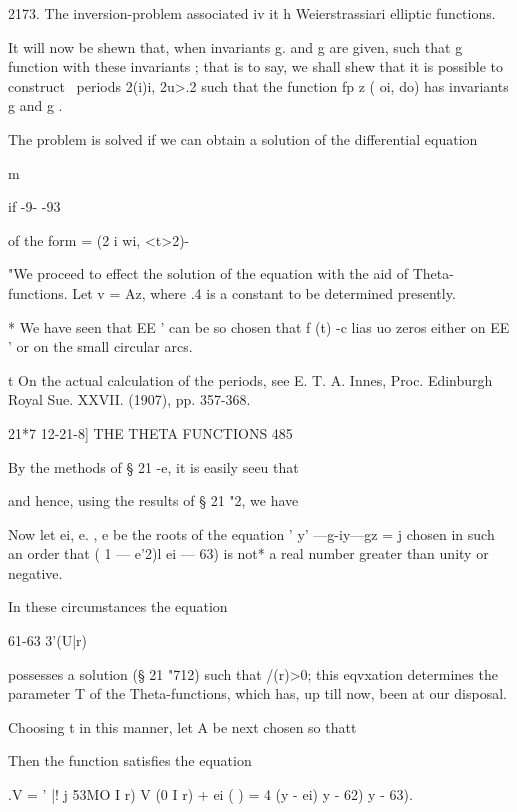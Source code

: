 2173. The inversion-problem associated iv it h Weierstrassiari
elliptic functions.

It will now be shewn that, when invariants g. and g are given, such
that g %
function with these invariants ; that is to say, we shall shew that it
is possible to construct \ periods 2(i)i, 2u>.2 such that the function
fp z ( oi, do) has invariants g and g .

The problem is solved if we can obtain a solution of the differential
equation



m



   if -9- -93

of the form = (2 i wi, <t>2)-

"We proceed to effect the solution of the equation with the aid of
Theta-functions. Let v = Az, where .4 is a constant to be determined
presently.

* We have seen that EE ' can be so chosen that f (t) -c lias uo zeros
either on EE ' or on the small circular arcs.

t On the actual calculation of the periods, see E. T. A. Innes, Proc.
Edinburgh Royal Sue. XXVII. (1907), pp. 357-368.



21*7 12-21-8] THE THETA FUNCTIONS 485

By the methods of § 21 -e, it is easily seeu that

and hence, using the results of § 21 "2, we have

Now let ei, e. , e be the roots of the equation ' y' —g-iy—gz = j
chosen in such an order that ( 1 — e'2)l ei — 63) is not* a real
number greater than unity or negative.

In these circumstances the equation

61-63 3'(U|r)

possesses a solution (§ 21 "712) such that /(r)>0; this eqvxation
determines the parameter T of the Theta-functions, which has, up till
now, been at our disposal.

Choosing t in this manner, let A be next chosen so thatt



Then the function satisfies the equation



.V = ' |! j 53MO I r) V (0 I r) + ei ( ) = 4 (y - ei) y - 62) y - 63).



